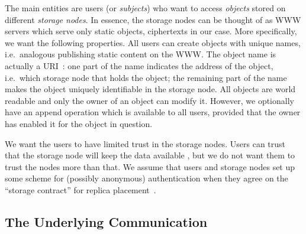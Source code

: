 The main entities are users (or \emph{subjects}) who want to access 
\emph{objects} stored on different \emph{storage nodes}.
In essence, the storage nodes can be thought of as \ac{WWW} servers which serve 
only static objects, ciphertexts in our case.
More specifically, we want the following properties.
All users can create objects with unique names, i.e.\ analogous publishing 
static content on the \ac{WWW}.
The object name is actually a \ac{URI}~\cite{rfc3986}:
one part of the name indicates the address of the object, i.e.\ which storage 
node that holds the object;
the remaining part of the name makes the object uniquely identifiable in the 
storage node.
All objects are world readable and only the owner of an object can modify it.
However, we optionally have an append operation which is available to all 
users, provided that the owner has enabled it for the object in question.


We want the users to have limited trust in the storage nodes.
Users can trust that the storage node will keep the data available 
\cite{dataavailability,replicaplacement}, but we do not want them to trust the 
nodes more than that.
We assume that users and storage nodes set up some scheme for (possibly 
anonymous) authentication when they agree on the \enquote{storage contract} for 
replica placement~\cite{replicaplacement}.

\subsection{The Underlying Communication}


